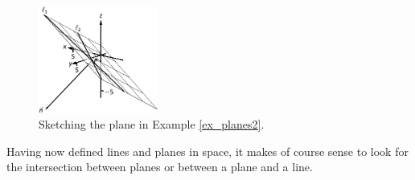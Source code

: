 \begin{example}
\begin{figure}[H]
	\begin{center}
			\includegraphics[width=0.35\textwidth]{fig_ana_geo_6}
	\caption{Sketching the plane in Example \ref{ex_planes2}.}
	\label{fig_ana_geo_6}
	\end{center}
\end{figure}

\end{example}


Having now defined lines and planes in space, it makes of course sense to look for the intersection between planes or between a plane and a line. 


